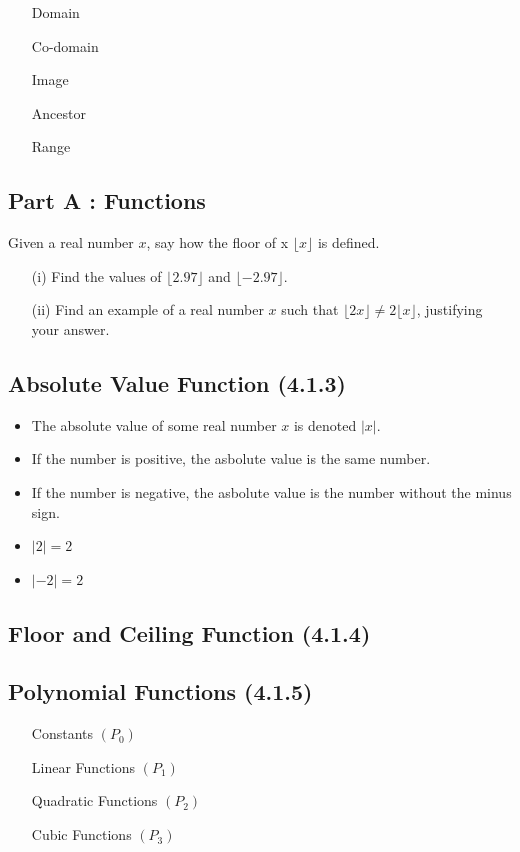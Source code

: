\documentclass[]{report}
\begin{document}
\begin{itemize}
\item[Domain]
\item[Co-domain]
\item[Image]
\item[Ancestor]
\item[Range]
\end{itemize}

\subsection*{Part A : Functions}
Given a real number $x$, say how the floor of x  $\lfloor x \rfloor$ is defined.
\begin{itemize}
\item[(i)] Find the values of $\lfloor 2.97 \rfloor$ and $\lfloor -2.97 \rfloor$.
\item[(ii)] Find an example of a real number $x$ such that $\lfloor 2x \rfloor  \neq 2\lfloor x \rfloor$, justifying your answer.
\end{itemize}



\subsection*{Absolute Value Function (4.1.3)}


\begin{itemize}
\item The absolute value of some real number $x$ is denoted $|x|$.
\item If the number is positive, the asbolute value is the same number.
\item If the number is negative, the asbolute value is the number without the minus sign.
\item $|2|=2$
\item $|-2| = 2$
\end{itemize}
\subsection*{Floor and Ceiling Function (4.1.4)}
\subsection*{Polynomial Functions (4.1.5)}

\begin{itemize}
\item[Constants] $(P_0)$
\item[Linear Functions] $(P_1)$
\item[Quadratic Functions] $(P_2)$
\item[Cubic Functions] $(P_3)$
\end{itemize}
\end{document}
